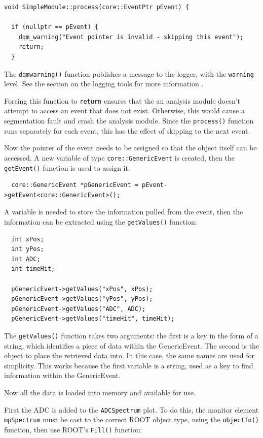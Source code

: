 \begin{lstlisting}
void SimpleModule::process(core::EventPtr pEvent) {

  if (nullptr == pEvent) {
    dqm_warning("Event pointer is invalid - skipping this event");
    return;
  }
\end{lstlisting}

The \texttt{dqm\textunderscore warning()} function publishes a message to the logger, with the \texttt{warning} level. See the section on the logging tools for more information  .

Forcing this function to \texttt{return} ensures that the an analysis module doesn't attempt to access an event that does not exist. Otherwise, this would cause a segmentation fault and crash the analysis module. Since the \texttt{process()} function runs separately for each event, this has the effect of skipping to the next event.

Now the pointer of the event needs to be assigned so that the object itself can be accessed. A new variable of type \texttt{core::GenericEvent} is created, then the \texttt{getEvent()} function is used to assign it.

\begin{lstlisting}
  core::GenericEvent *pGenericEvent = pEvent->getEvent<core::GenericEvent>();
\end{lstlisting}

A variable is needed to store the information pulled from the event, then the information can be extracted using the \texttt{getValues()} function:

\begin{lstlisting}
  int xPos;
  int yPos;
  int ADC;
  int timeHit;

  pGenericEvent->getValues("xPos", xPos);
  pGenericEvent->getValues("yPos", yPos);
  pGenericEvent->getValues("ADC", ADC);
  pGenericEvent->getValues("timeHit", timeHit);
\end{lstlisting}

The \texttt{getValues()} function takes two arguments: the first is a key in the form of a string, which identifies a piece of data within the GenericEvent. The second is the object to place the retrieved data into. In this case, the same names are used for simplicity. This works because the first variable is a string, used as a key to find information within the GenericEvent.

Now all the data is loaded into memory and available for use. 

First the ADC is added to the \texttt{ADC\textunderscore Spectrum} plot. To do this, the monitor element \texttt{m\textunderscore pSpectrum} must be cast to the correct ROOT object type, using the \texttt{objectTo()} function, then use ROOT's \texttt{Fill()} function:

